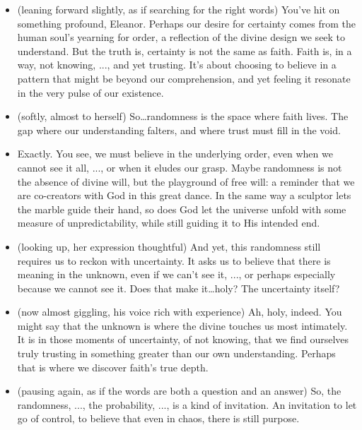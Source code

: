 \begin{itemize}[leftmargin=2cm,labelsep=1em]
  \item[\textbf{Priest :}] (leaning forward slightly, as if searching for the right words)
  You’ve hit on something profound, Eleanor. 
  Perhaps our desire for certainty comes from the human soul’s yearning for order, a reflection of the divine design we seek to understand. 
  But the truth is, certainty is not the same as faith. 
  Faith is, in a way, not knowing, ..., and yet trusting. 
  It’s about choosing to believe in a pattern that might be beyond our comprehension, 
  and yet feeling it resonate in the very pulse of our existence.

  \item[\textbf{Eleanor :}] (softly, almost to herself)
  So\ldots randomness is the space where faith lives. 
  The gap where our understanding falters, and where trust must fill in the void.

  \item[\textbf{Priest:}] 
  Exactly. You see, we must believe in the underlying order, even when we cannot see it all, ..., or when it eludes our grasp. 
  Maybe randomness is not the absence of divine will, but the playground of free will:
  a reminder that we are co-creators with God in this great dance. 
  In the same way a sculptor lets the marble guide their hand, 
  so does God let the universe unfold with some measure of unpredictability, while still guiding it to His intended end.

  \item[\textbf{Eleanor :}] (looking up, her expression thoughtful)
  And yet, this randomness still requires us to reckon with uncertainty. 
  It asks us to believe that there is meaning in the unknown, even if we can’t see it, ..., 
  or perhaps especially because we cannot see it. 
  Does that make it\ldots holy? The uncertainty itself?

  \item[\textbf{Priest :}] (now almost giggling, his voice rich with experience)
  Ah, holy, indeed. You might say that the unknown is where the divine touches us most intimately. 
  It is in those moments of uncertainty, of not knowing, 
  that we find ourselves truly trusting in something greater than our own understanding. 
  Perhaps that is where we discover faith’s true depth.

  \item[\textbf{Eleanor :}] (pausing again, as if the words are both a question and an answer)
  So, the randomness, ..., the probability, ...,  is a kind of invitation. 
  An invitation to let go of control, to believe that even in chaos, there is still purpose.


\end{itemize}
